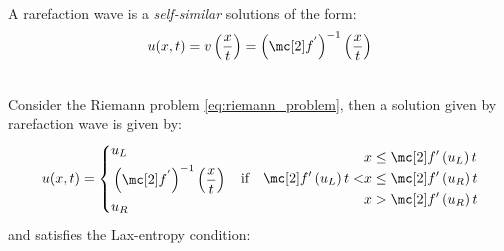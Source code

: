 \begin{defnbox}\nospacing
    \begin{defn}
        \label{defn:rarefaction_wave}\leavevmode\\
        A rarefaction wave is a \textit{self-similar} solutions of the form:
        \begin{align}
          u(x,t)=v \left(\frac{x}{t}\right)=\left(\flux^{'}\right)^{-1}\left(\frac{x}{t}\right)
        \end{align}
    \end{defn}
\end{defnbox}
\begin{corbox}\nospacing
    \begin{cor}\leavevmode\\
        \label{cor:rarefaction_solution_riemann_problem}
        Consider the Riemann problem \cref{eq:riemann_problem}, then a
        solution given by rarefaction wave is given by:
        \begin{align}
          u(x,t)=
          \left\{\begin{aligned}
                  &u_{L}\\
                  &\left(\flux^{'}\right)^{-1}\left(\frac{x}{t}\right)\\
                  &u_{R}
          \end{aligned}\right.&&\text{if}&&
                                    \begin{aligned}
                                     &x\leq\flux'\left(u_{L}\right)t\\
                                     \flux'\left(u_{L}\right)t<&x\leq\flux'\left(u_{R}\right)t\\
                                     &x>\flux'\left(u_{R}\right)t
                                    \end{aligned}
        \end{align}
        and satisfies the Lax-entropy condition:
    \end{cor}
\end{corbox}
